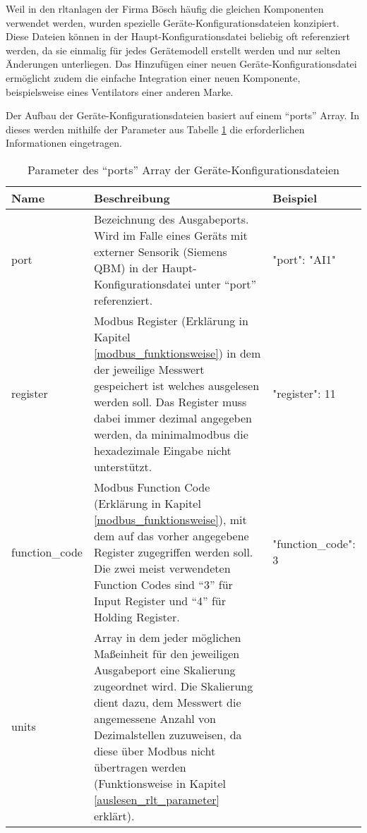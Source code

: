 \begin{enumerate}
	Weil in den \acs{rltanlagen} der Firma Bösch häufig die gleichen Komponenten verwendet werden, wurden spezielle Geräte-Konfigurationsdateien konzipiert. Diese Dateien können in der Haupt-Konfigurationsdatei beliebig oft referenziert werden, da sie einmalig für jedes Gerätemodell erstellt werden und nur selten Änderungen unterliegen. Das Hinzufügen einer neuen Geräte-Konfigurationsdatei ermöglicht zudem die einfache Integration einer neuen Komponente, beispielsweise eines Ventilators einer anderen Marke.
	
	Der Aufbau der Geräte-Konfigurationsdateien basiert auf einem \enquote{ports} Array. In dieses werden mithilfe der Parameter aus Tabelle \ref{tab:ports_array_parameter} die erforderlichen Informationen eingetragen.
	
	\begin{table}[H]
		\caption{Parameter des \enquote{ports} Array der Geräte-Konfigurationsdateien}
		\label{tab:ports_array_parameter}
		\begin{tabular}{p{} p{} | p{}}
			\toprule
			\textbf{Name} & \textbf{Beschreibung} & \textbf{Beispiel} \\
			\midrule
			port      	& Bezeichnung des Ausgabeports. Wird im Falle eines Geräts mit externer Sensorik (\zB Siemens QBM) in der Haupt-Konfigurationsdatei unter \enquote{port} referenziert. & 
			\begin{jsonTable}
"port": "AI1"
			\end{jsonTable} 
			\\
			register 	& Modbus Register (Erklärung in Kapitel \ref{modbus_funktionsweise}) in dem der jeweilige Messwert gespeichert ist \bzw welches ausgelesen werden soll. Das Register muss dabei immer dezimal angegeben werden, da minimalmodbus die hexadezimale Eingabe nicht unterstützt. & 
			\begin{jsonTable}
"register": 11
			\end{jsonTable} 
			\\
			function\_code 	& Modbus Function Code (Erklärung in Kapitel \ref{modbus_funktionsweise}), mit dem auf das vorher angegebene Register zugegriffen werden soll. Die zwei meist verwendeten Function Codes sind \enquote{3} für Input Register und \enquote{4} für Holding Register. & 
			\begin{jsonTable}
"function_code": 3
			\end{jsonTable} 
			\\
			units 	& Array in dem jeder möglichen Maßeinheit für den jeweiligen Ausgabeport eine Skalierung zugeordnet wird. Die Skalierung dient \zB dazu, dem Messwert die angemessene Anzahl von Dezimalstellen zuzuweisen, da diese über Modbus nicht übertragen werden (Funktionsweise in Kapitel \ref{auslesen_rlt_parameter} erklärt).
			

\end{tabular}
\end{table}
\end{enumerate}
